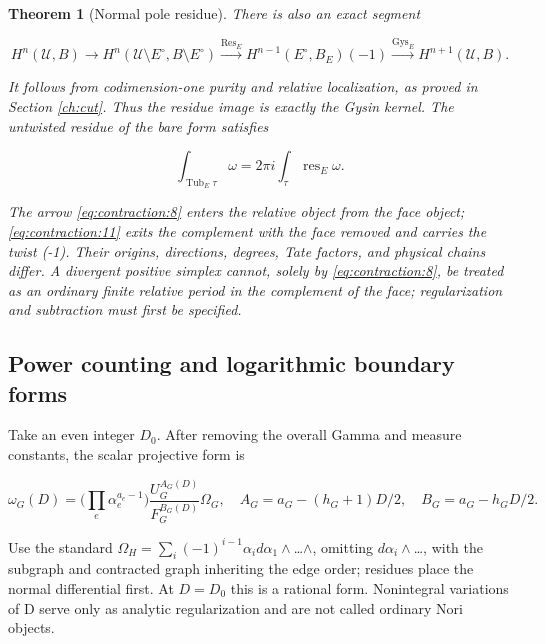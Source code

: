 \documentclass[11pt,a4paper,oneside]{article}
\theoremstyle{plain}
\newtheorem{theorem}{Theorem}[section]
\theoremstyle{definition}
\theoremstyle{remark}
\numberwithin{equation}{section}
\begin{document}
\begin{theorem}[Normal pole residue]

\label{thm:contraction:3.2} There is also an exact segment

\begin{equation}
H^n(\mathcal U,B)\longrightarrow
 H^n(\mathcal U\setminus E^\circ,B\setminus E^\circ)
 \xrightarrow{\operatorname{Res}_E}
 H^{n-1}(E^\circ,B_E)(-1)
 \xrightarrow{\operatorname{Gys}_E}H^{n+1}(\mathcal U,B).          \label{eq:contraction:11}
\end{equation}

It follows from codimension-one purity and relative localization, as proved in Section \ref{ch:cut}. Thus the residue image is exactly the Gysin kernel. The untwisted residue of the bare form satisfies

\begin{equation}
\int_{\operatorname{Tub}_E\tau}\omega
                     =2\pi i\int_\tau\operatorname{res}_E\omega.              \label{eq:contraction:12}
\end{equation}

The arrow \eqref{eq:contraction:8} enters the relative object from the face object; \eqref{eq:contraction:11} exits the complement with the face removed and carries the twist (-1). Their origins, directions, degrees, Tate factors, and physical chains differ. A divergent positive simplex cannot, solely by \eqref{eq:contraction:8}, be treated as an ordinary finite relative period in the complement of the face; regularization and subtraction must first be specified.

\end{theorem}


\subsection{Power counting and logarithmic boundary forms}\label{sec:contraction:4}

Take an even integer \(D_0\). After removing the overall Gamma and measure constants, the scalar projective form is

\begin{equation}
\omega_G(D)=\Big(\prod_e\alpha_e^{a_e-1}\Big)
       \frac{U_G^{A_G(D)}}{F_G^{B_G(D)}}\Omega_G,
 \quad A_G=a_G-(h_G+1)D/2,\quad B_G=a_G-h_GD/2.                  \label{eq:contraction:13}
\end{equation}

Use the standard \(\Omega _H=\sum _i(- 1)^{i- 1}\alpha _i d\alpha _1\wedge \)\ldots{}\(\wedge \), omitting \(d\alpha _i\wedge \)\ldots, with the subgraph and contracted graph inheriting the edge order; residues place the normal differential first. At \(D=D_0\) this is a rational form. Nonintegral variations of D serve only as analytic regularization and are not called ordinary Nori objects.
\end{document}
